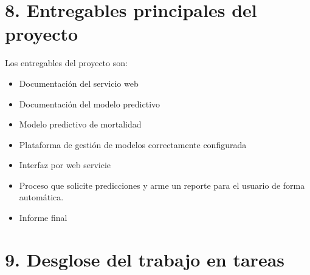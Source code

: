 \documentclass[
11pt, %
]{charter}
\begin{document}
\section{8. Entregables principales del proyecto}
\label{sec:entregables}

Los entregables del proyecto son:

\begin{itemize}
	\item Documentación del servicio web
	\item Documentación del modelo predictivo 
	\item Modelo predictivo de mortalidad
	\item Plataforma de gestión de modelos correctamente configurada
	\item Interfaz por web servicie	
	\item Proceso que solicite predicciones y arme un reporte para el usuario de forma automática.
	\item Informe final
\end{itemize}

\section{9. Desglose del trabajo en tareas}
\label{sec:wbs}
\end{document}
